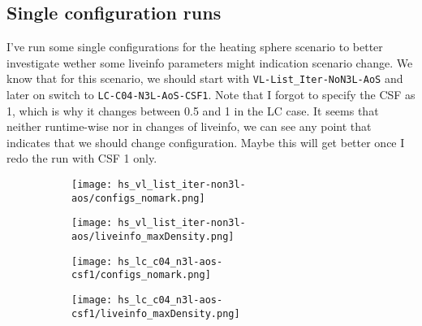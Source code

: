 \documentclass[]{article}
\begin{document}
\subsection{Single configuration runs}

I've run some single configurations for the heating sphere scenario to better investigate wether some liveinfo parameters might indication scenario change. We know that for this scenario, we should start with \texttt{VL-List\_Iter-NoN3L-AoS} and later on switch to \texttt{LC-C04-N3L-AoS-CSF1}. Note that I forgot to specify the CSF as 1, which is why it changes between 0.5 and 1 in the LC case. It seems that neither runtime-wise nor in changes of liveinfo, we can see any point that indicates that we should change configuration. Maybe this will get better once I redo the run with CSF 1 only.


\begin{figure}[H]
	\begin{center}
		\begin{subfigure}[t]{0.4\textwidth}
			\texttt{[image: hs\_vl\_list\_iter-non3l-aos/configs\_nomark.png]}
		\end{subfigure}
		\begin{subfigure}[t]{0.4\textwidth}
			\texttt{[image: hs\_vl\_list\_iter-non3l-aos/liveinfo\_maxDensity.png]}
		\end{subfigure}
	\end{center}
	\begin{center}
		\begin{subfigure}[t]{0.4\textwidth}
			\texttt{[image: hs\_lc\_c04\_n3l-aos-csf1/configs\_nomark.png]}
		\end{subfigure}
		\begin{subfigure}[t]{0.4\textwidth}
			\texttt{[image: hs\_lc\_c04\_n3l-aos-csf1/liveinfo\_maxDensity.png]}
		\end{subfigure}
	\end{center}
	\label{single_config}
\end{figure}

%
\end{document}
